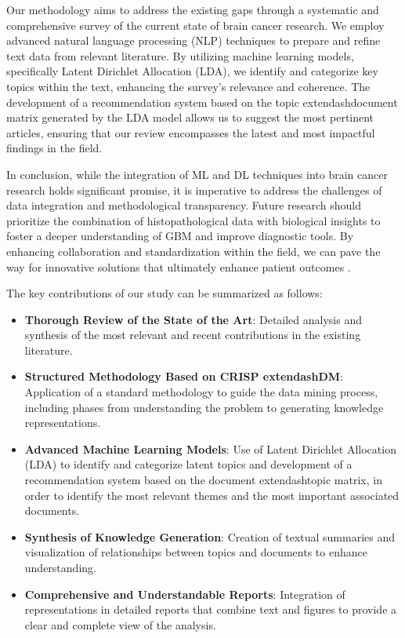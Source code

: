 \documentclass[runningheads]{llncs}
\begin{document}
Our methodology aims to address the existing gaps through a systematic and comprehensive survey of the current state of brain cancer research. We employ advanced natural language processing (NLP) techniques to prepare and refine text data from relevant literature. By utilizing machine learning models, specifically Latent Dirichlet Allocation (LDA), we identify and categorize key topics within the text, enhancing the survey's relevance and coherence. The development of a recommendation system based on the topic	extendash{}document matrix generated by the LDA model allows us to suggest the most pertinent articles, ensuring that our review encompasses the latest and most impactful findings in the field.

In conclusion, while the integration of ML and DL techniques into brain cancer research holds significant promise, it is imperative to address the challenges of data integration and methodological transparency. Future research should prioritize the combination of histopathological data with biological insights to foster a deeper understanding of GBM and improve diagnostic tools. By enhancing collaboration and standardization within the field, we can pave the way for innovative solutions that ultimately enhance patient outcomes \cite{Chun_2025}.

The key contributions of our study can be summarized as follows: 

\begin{itemize}
    \item \textbf{Thorough Review of the State of the Art}: Detailed analysis and synthesis of the most relevant and recent contributions in the existing literature.
    \item \textbf{Structured Methodology Based on CRISP	extendash{}DM}: Application of a standard methodology to guide the data mining process, including phases from understanding the problem to generating knowledge representations.
    \item \textbf{Advanced Machine Learning Models}: Use of Latent Dirichlet Allocation (LDA) to identify and categorize latent topics and development of a recommendation system based on the document	extendash{}topic matrix, in order to identify the most relevant themes and the most important associated documents.
    \item \textbf{Synthesis of Knowledge Generation}: Creation of textual summaries and visualization of relationships between topics and documents to enhance understanding.
    \item \textbf{Comprehensive and Understandable Reports}: Integration of representations in detailed reports that combine text and figures to provide a clear and complete view of the analysis.
\end{itemize}
\end{document}
